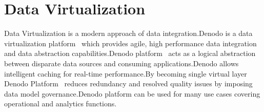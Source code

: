 \section{Data Virtualization}
Data Virtualization is a modern approach of data integration.Denodo is a data virtualization platform~\cite{denodo} which provides agile, high performance data integration and data abstraction capabilities.Denodo platform~\cite{denodo} acts as a logical abstraction between disparate data sources and consuming applications.Denodo allows~\cite{denodo} intelligent caching for real-time performance.By becoming single virtual layer Denodo Platform~\cite{denodo} reduces redundancy and resolved quality issues by imposing data model governance.Denodo platform can be used for many use cases covering operational and analytics functions.
